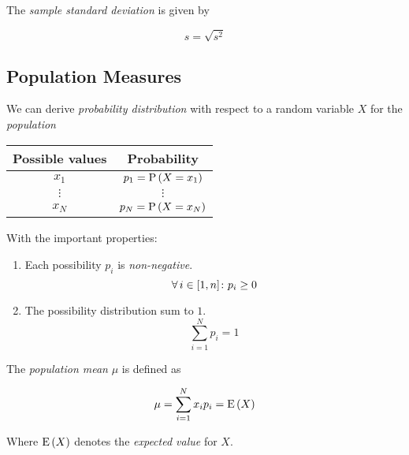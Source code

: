 \begin{definition}
    The \textit{sample standard deviation} is given by
    
    \begin{equation}
        s = \sqrt{s^2}
    \end{equation}
\end{definition}

\subsection{Population Measures}

\begin{definition}
    We can derive \textit{probability distribution} with respect to a random variable $X$ for the \textit{population}
    
    \begin{center}
        \begin{tabular}{c|c}
            Possible values & Probability \\
            \hline
            $x_1$ & $p_1 = \mathrm{P} \left( X = x_1 \right)$ \\
            $\vdots$ & $\vdots$ \\
            $x_N$ & $p_N = \mathrm{P} \left( X = x_N \right)$ \\
        \end{tabular}
    \end{center}
    
    With the important properties:
    
    \begin{enumerate}
        \item Each possibility $p_i$ is \textit{non-negative}.
            \begin{equation}
                \operatorname{\forall} i \in [1, n] \colon p_i \ge 0
            \end{equation}
        \item The possibility distribution sum to $1$.
            \begin{equation}
                \sum \limits_{i = 1}^{N} p_i = 1
            \end{equation}
    \end{enumerate}
\end{definition}

\begin{definition}
    The \textit{population mean} $\mu$ is defined as
    
    \begin{equation}
        \mu = \sum \limits_{i=1}^{N} x_i p_i = \mathrm{E} \left( X \right)
    \end{equation}
    
    Where $\mathrm{E} \left( X \right)$ denotes the \textit{expected value} for $X$.
\end{definition}

